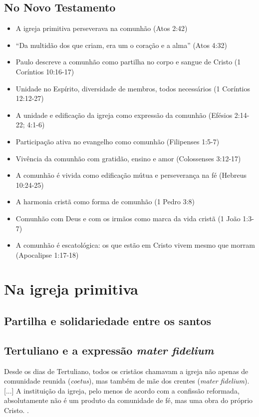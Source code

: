 \subsection{No Novo Testamento}

\begin{itemize}
\item A igreja primitiva perseverava na comunhão (Atos 2:42)
\item ``Da multidão dos que criam, era um o coração e a alma'' (Atos 4:32)
\item Paulo descreve a comunhão como partilha no corpo e sangue de Cristo (1 Coríntios 10:16-17)
\item Unidade no Espírito, diversidade de membros, todos necessários (1 Coríntios 12:12-27)
\item A unidade e edificação da igreja como expressão da comunhão (Efésios 2:14-22; 4:1-6)
\item Participação ativa no evangelho como comunhão (Filipenses 1:5-7)
\item Vivência da comunhão com gratidão, ensino e amor (Colossenses 3:12-17)
\item A comunhão é vivida como edificação mútua e perseverança na fé (Hebreus 10:24-25)
\item A harmonia cristã como forma de comunhão (1 Pedro 3:8)
\item Comunhão com Deus e com os irmãos como marca da vida cristã (1 João 1:3-7)
\item A comunhão é escatológica: os que estão em Cristo vivem mesmo que morram (Apocalipse 1:17-18)
\end{itemize}

\section{Na igreja primitiva}

\subsection{Partilha e solidariedade entre os santos}

\subsection{Tertuliano e a expressão \textit{mater fidelium}}
\begin{citacao}
Desde os dias de Tertuliano, todos os cristãos chamavam a igreja não apenas de comunidade reunida (\textit{coetus}), mas também de mãe dos crentes (\textit{mater fidelium}). [...] A instituição da igreja, pelo menos de acordo com a confissão reformada, absolutamente não é um produto da comunidade de fé, mas uma obra do próprio Cristo. \cite[335]{bavinck2012}.
\end{citacao}


